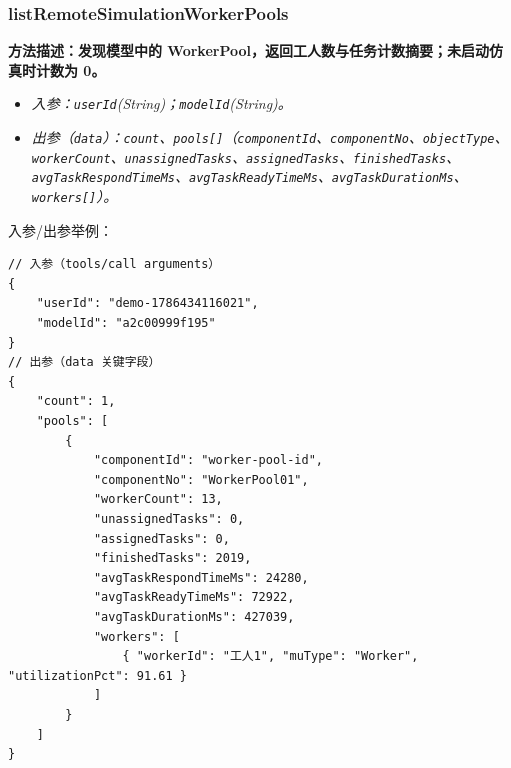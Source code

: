 \subsubsection{listRemoteSimulationWorkerPools}
\bf{方法描述}：发现模型中的 WorkerPool，返回工人数与任务计数摘要；未启动仿真时计数为 0。
\begin{itemize}
	\item \it{入参}：\texttt{userId}(String)；\texttt{modelId}(String)。
	\item \it{出参}（\texttt{data}）：\texttt{count}、\texttt{pools[]}（\texttt{componentId}、\texttt{componentNo}、\texttt{objectType}、\texttt{workerCount}、\texttt{unassignedTasks}、\texttt{assignedTasks}、\texttt{finishedTasks}、\texttt{avgTaskRespondTimeMs}、\texttt{avgTaskReadyTimeMs}、\texttt{avgTaskDurationMs}、\texttt{workers[]}）。
\end{itemize}
入参/出参举例：
\begin{lstlisting}
// 入参（tools/call arguments）
{
    "userId": "demo-1786434116021",
    "modelId": "a2c00999f195"
}
// 出参（data 关键字段）
{
    "count": 1,
    "pools": [
        {
            "componentId": "worker-pool-id",
            "componentNo": "WorkerPool01",
            "workerCount": 13,
            "unassignedTasks": 0,
            "assignedTasks": 0,
            "finishedTasks": 2019,
            "avgTaskRespondTimeMs": 24280,
            "avgTaskReadyTimeMs": 72922,
            "avgTaskDurationMs": 427039,
            "workers": [
                { "workerId": "工人1", "muType": "Worker", "utilizationPct": 91.61 }
            ]
        }
    ]
}
\end{lstlisting}\vspace{-30pt}

